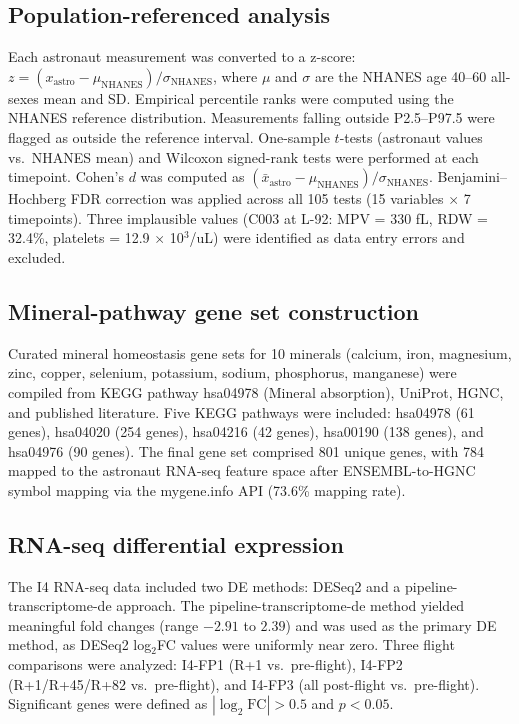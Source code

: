 \documentclass[11pt,a4paper]{article}
\begin{document}
\subsection{Population-referenced analysis}

Each astronaut measurement was converted to a z-score: $z = (x_{\text{astro}} - \mu_{\text{NHANES}}) / \sigma_{\text{NHANES}}$, where $\mu$ and $\sigma$ are the NHANES age 40--60 all-sexes mean and SD. Empirical percentile ranks were computed using the NHANES reference distribution. Measurements falling outside P2.5--P97.5 were flagged as outside the reference interval. One-sample $t$-tests (astronaut values vs.\ NHANES mean) and Wilcoxon signed-rank tests were performed at each timepoint. Cohen's $d$ was computed as $(\bar{x}_{\text{astro}} - \mu_{\text{NHANES}}) / \sigma_{\text{NHANES}}$. Benjamini--Hochberg FDR correction was applied across all 105 tests (15 variables $\times$ 7 timepoints). Three implausible values (C003 at L-92: MPV = 330 fL, RDW = 32.4\%, platelets = 12.9 $\times$ 10$^3$/uL) were identified as data entry errors and excluded.

\subsection{Mineral-pathway gene set construction}

Curated mineral homeostasis gene sets for 10 minerals (calcium, iron, magnesium, zinc, copper, selenium, potassium, sodium, phosphorus, manganese) were compiled from KEGG pathway hsa04978 (Mineral absorption), UniProt, HGNC, and published literature. Five KEGG pathways were included: hsa04978 (61 genes), hsa04020 (254 genes), hsa04216 (42 genes), hsa00190 (138 genes), and hsa04976 (90 genes). The final gene set comprised 801 unique genes, with 784 mapped to the astronaut RNA-seq feature space after ENSEMBL-to-HGNC symbol mapping via the mygene.info API (73.6\% mapping rate).

\subsection{RNA-seq differential expression}

The I4 RNA-seq data included two DE methods: DESeq2 and a pipeline-transcriptome-de approach. The pipeline-transcriptome-de method yielded meaningful fold changes (range $-2.91$ to $2.39$) and was used as the primary DE method, as DESeq2 log$_2$FC values were uniformly near zero. Three flight comparisons were analyzed: I4-FP1 (R+1 vs.\ pre-flight), I4-FP2 (R+1/R+45/R+82 vs.\ pre-flight), and I4-FP3 (all post-flight vs.\ pre-flight). Significant genes were defined as $|\log_2\text{FC}| > 0.5$ and $p < 0.05$.
\end{document}
